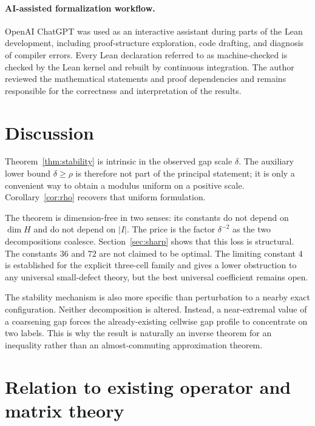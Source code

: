 \documentclass[11pt]{article}
\newcommand{\dd}{\delta}
\begin{document}
\paragraph{AI-assisted formalization workflow.}
OpenAI ChatGPT was used as an interactive assistant during parts of the Lean
development, including proof-structure exploration, code drafting, and
diagnosis of compiler errors.  Every Lean declaration referred to as
machine-checked is checked by the Lean kernel and rebuilt by continuous
integration.  The author reviewed the mathematical statements and proof
dependencies and remains responsible for the correctness and interpretation
of the results.

\section{Discussion}

Theorem~\ref{thm:stability} is intrinsic in the observed gap scale $\dd$.
The auxiliary lower bound $\dd\ge\rho$ is therefore not part of the principal
statement; it is only a convenient way to obtain a modulus uniform on a
positive scale.  Corollary~\ref{cor:rho} recovers that uniform formulation.

The theorem is dimension-free in two senses: its constants do not depend on
$\dim H$ and do not depend on $|I|$.  The price is the factor
$\dd^{-2}$ as the two decompositions coalesce.  Section~\ref{sec:sharp}
shows that this loss is structural.  The constants $36$ and $72$ are not
claimed to be optimal.  The limiting constant $4$ is established for the
explicit three-cell family and gives a lower obstruction to any universal
small-defect theory, but the best universal coefficient remains open.

The stability mechanism is also more specific than perturbation to a nearby
exact configuration.  Neither decomposition is altered.  Instead, a
near-extremal value of a coarsening gap forces the already-existing
cellwise gap profile to concentrate on two labels.  This is why the result is
naturally an inverse theorem for an inequality rather than an
almost-commuting approximation theorem.

\section{Relation to existing operator and matrix theory}
\label{sec:related}
\end{document}
